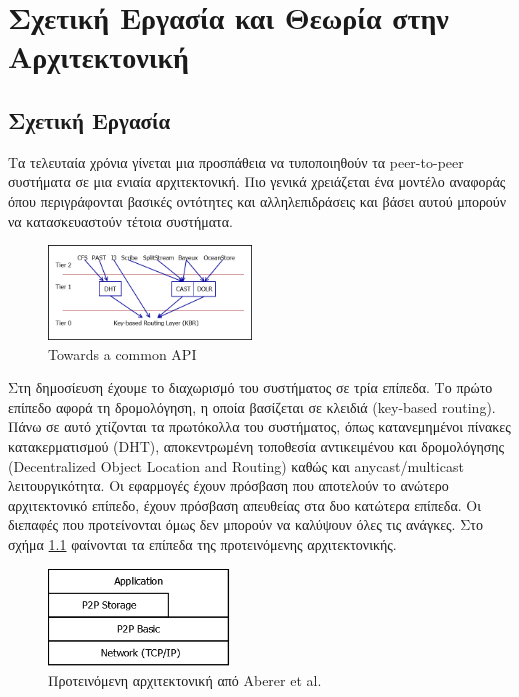 \chapter{Σχετική Εργασία και Θεωρία στην Αρχιτεκτονική} 
\label{chap:Literature}

\section{Σχετική Εργασία}

Τα τελευταία χρόνια γίνεται μια προσπάθεια να τυποποιηθούν τα 
peer-to-peer συστήματα σε μια ενιαία αρχιτεκτονική. Πιο γενικά χρειάζεται ένα 
μοντέλο αναφοράς όπου περιγράφονται βασικές οντότητες και 
αλληλεπιδράσεις και βάσει αυτού μπορούν να κατασκευαστούν τέτοια 
συστήματα.

\begin{figure}
  \begin{center}
    \includegraphics[width=0.48\textwidth]{Figures/Related_work/Towards_a_common_API_(tiers).png}
  \end{center}
  \caption{Towards a common API}
  \label{fig:Α_common_API}
\end{figure}
Στη δημοσίευση \citep{F.Dabek2003} έχουμε το διαχωρισμό του συστήματος 
σε τρία επίπεδα. Το πρώτο επίπεδο αφορά τη δρομολόγηση, η οποία βασίζεται σε κλειδιά 
(key-based routing). Πάνω σε αυτό χτίζονται τα πρωτόκολλα του συστήματος, 
όπως κατανεμημένοι πίνακες κατακερματισμού (DHT), αποκεντρωμένη 
τοποθεσία αντικειμένου και δρομολόγησης (Decentralized Object Location 
and Routing) καθώς και anycast/multicast λειτουργικότητα. Οι εφαρμογές 
έχουν πρόσβαση που αποτελούν το ανώτερο αρχιτεκτονικό επίπεδο, έχουν 
πρόσβαση απευθείας στα δυο κατώτερα επίπεδα. Οι διεπαφές που 
προτείνονται όμως δεν μπορούν να καλύψουν όλες τις ανάγκες. Στο σχήμα  
\ref{fig:Α_common_API} φαίνονται τα επίπεδα της προτεινόμενης αρχιτεκτονικής.

\begin{figure}
  \begin{center}
    \includegraphics[width=0.43\textwidth]{Figures/Related_work/The_essence_of_p2p_(architecture).png}
  \end{center}
  \caption{Προτεινόμενη αρχιτεκτονική από Aberer et al.}
  \label{fig:Essence}
\end{figure}

